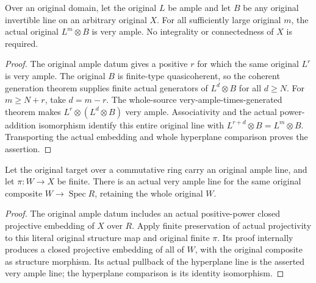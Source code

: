 \begin{corollary}
\label{cor:kn-nadel-ample-eventual-very-ample-arbitrary}
\leanok
{}
Over an original domain, let the original $L$ be ample and let $B$ be any
original invertible line on an arbitrary original $X$. For all sufficiently
large original $m$, the actual original $L^m\otimes B$ is very ample.
No integrality or connectedness of $X$ is required.
\end{corollary}
\begin{proof}
The original ample datum gives a positive $r$ for which the same original
$L^r$ is very ample. The original $B$ is finite-type quasicoherent, so the
coherent generation theorem supplies finite actual generators of
$L^d\otimes B$ for all $d\geq N$. For $m\geq N+r$, take $d=m-r$.
The whole-source very-ample-times-generated theorem makes
$L^r\otimes(L^d\otimes B)$ very ample. Associativity and the actual
power-addition isomorphism identify this entire original line with
$L^{r+d}\otimes B=L^m\otimes B$. Transporting the actual embedding and
whole hyperplane comparison proves the assertion.
\end{proof}

\begin{lemma}
\label{lem:kn-nadel-finite-source-very-ample}
\leanok
{}
Let the original target over a commutative ring carry an original ample
line, and let $\pi:W\to X$ be finite. There is an actual very ample line
for the same original composite $W\to\operatorname{Spec}R$, retaining the
whole original $W$.
\end{lemma}
\begin{proof}
The original ample datum includes an actual positive-power closed
projective embedding of $X$ over $R$. Apply finite preservation of actual
projectivity to this literal original structure map and original finite
$\pi$. Its proof internally produces a closed projective embedding of
all of $W$, with the original composite as structure morphism. Its actual
pullback of the hyperplane line is the asserted very ample line; the
hyperplane comparison is its identity isomorphism.
\end{proof}

